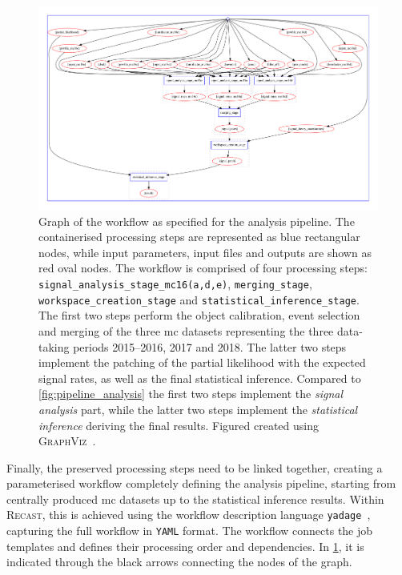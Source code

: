  \begin{figure}
	\centering\includegraphics[width=1.0\textwidth]{yadage_workflow_instance}
	\caption{Graph of the workflow as specified for the analysis pipeline. The containerised processing steps are represented as blue rectangular nodes, while input parameters, input files and outputs are shown as red oval nodes. The workflow is comprised of four processing steps: \texttt{signal\_analysis\_stage\_mc16(a,d,e)}, \texttt{merging\_stage}, \texttt{workspace\_creation\_stage} and \texttt{statistical\_inference\_stage}. The first two steps perform the object calibration, event selection and merging of the three \gls{mc} datasets representing the three data-taking periods 2015--2016, 2017 and 2018. The latter two steps implement the patching of the partial likelihood with the expected signal rates, as well as the final statistical inference. Compared to \cref{fig:pipeline_analysis} the first two steps implement the \textit{signal analysis} part, while the latter two steps implement the \textit{statistical inference} deriving the final results. Figured created using \textsc{GraphViz}~\cite{Gansner00anopen,neato}.} 
	\label{fig:recast_workflow}
\end{figure}


Finally, the preserved processing steps need to be linked together, creating a parameterised workflow completely defining the analysis pipeline, starting from centrally produced \gls{mc} datasets up to the statistical inference results. Within \textsc{Recast}, this is achieved using the workflow description language \texttt{yadage}~\cite{yadage:2017frf}, capturing the full workflow in \texttt{YAML} format. The workflow connects the job templates and defines their processing order and dependencies. In \cref{fig:recast_workflow}, it is indicated through the black arrows connecting the nodes of the graph.

